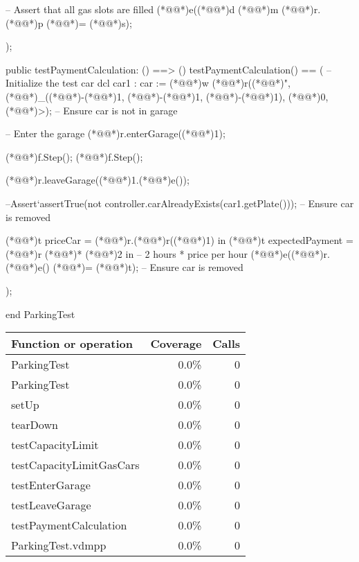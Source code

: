 \documentclass[a4paper]{article}
\begin{document}
\begin{vdm_al}
        -- Assert that all gas slots are filled
        (*@@*)e((*@@*)d (*@@*)m (*@@*)r.(*@@*)p (*@\vdmnotcovered{}@*)= (*@@*)s);

);


    public testPaymentCalculation: () ==> ()
testPaymentCalculation() ==
(
    -- Initialize the test car
    dcl car1 : car := (*@@*)w (*@@*)r((*@@*)", (*@@*)_((*@\vdmnotcovered{}@*)-(*@\vdmnotcovered{}@*)1, (*@\vdmnotcovered{}@*)-(*@\vdmnotcovered{}@*)1, (*@\vdmnotcovered{}@*)-(*@\vdmnotcovered{}@*)1), (*@\vdmnotcovered{}@*)0, (*@@*)>);
     -- Ensure car is not in garage
    
    -- Enter the garage
    (*@@*)r.enterGarage((*@@*)1);
    
    (*@@*)f.Step(); 
    (*@@*)f.Step();  
    
    (*@@*)r.leaveGarage((*@@*)1.(*@@*)e());

    --Assert`assertTrue(not controller.carAlreadyExists(car1.getPlate()));  -- Ensure car is removed
    
    (*@@*)t priceCar = (*@@*)r.(*@@*)r((*@@*)1) in
    (*@@*)t expectedPayment = (*@@*)r (*@\vdmnotcovered{}@*)* (*@\vdmnotcovered{}@*)2 in
      -- 2 hours * price per hour
    (*@@*)e((*@@*)r.(*@@*)e() (*@\vdmnotcovered{}@*)= (*@@*)t);  -- Ensure car is removed

    
);


end ParkingTest
\end{vdm_al}
\bigskip
\begin{longtable}{|l|r|r|}
\hline
Function or operation & Coverage & Calls \\
\hline
\hline
ParkingTest & 0.0\% & 0 \\
\hline
ParkingTest & 0.0\% & 0 \\
\hline
setUp & 0.0\% & 0 \\
\hline
tearDown & 0.0\% & 0 \\
\hline
testCapacityLimit & 0.0\% & 0 \\
\hline
testCapacityLimitGasCars & 0.0\% & 0 \\
\hline
testEnterGarage & 0.0\% & 0 \\
\hline
testLeaveGarage & 0.0\% & 0 \\
\hline
testPaymentCalculation & 0.0\% & 0 \\
\hline
\hline
ParkingTest.vdmpp & 0.0\% & 0 \\
\hline
\end{longtable}
\end{document}
